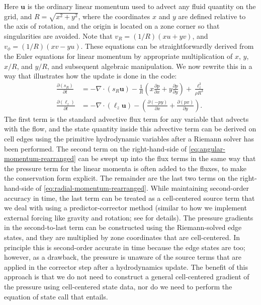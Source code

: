 \documentclass[12pt]{article}
\begin{document}
Here $\mathbf{u}$ is the ordinary linear momentum used to advect any fluid quantity
on the grid, and $R = \sqrt{x^2 + y^2}$, where the coordinates $x$ and $y$ are defined
relative to the axis of rotation, and the origin is located on a zone corner
so that singularities are avoided. Note that $v_R = (1 / R)(x u + y v)$, and
$v_\phi = (1/R)(x v - y u)$. These equations can be straightforwardly derived from
the Euler equations for linear momentum by appropriate multiplication of $x$, $y$,
$x / R$, and $y/R$, and subsequent algebraic manipulation. We now rewrite this in a way
that illustrates how the update is done in the code:
\begin{align}
  \frac{\partial(s_R)}{\partial t} &= -\nabla \cdot (s_R \mathbf{u})
    - \frac{1}{R}\left(x \frac{\partial p}{\partial x} + y \frac{\partial p}{\partial y}\right)
    + \frac{\ell_z^2}{\rho R^3} \label{eq:radial-momentum-rearranged}\\
    \frac{\partial(\ell_z)}{\partial t} &= -\nabla \cdot (\ell_z \mathbf{u}) - \left(\frac{\partial (-py)}{\partial x} + \frac{\partial(px)}{\partial y}\right).\label{eq:angular-momentum-rearranged}
\end{align}
The first term is the standard advective flux term for any variable that advects with
the flow, and the state quantity inside this advective term can be derived on cell edges
using the primitive hydrodynamic variables after a Riemann solver has been performed.
The second term on the right-hand-side of \autoref{eq:angular-momentum-rearranged} can be swept up
into the flux terms in the same way that the pressure term for the linear momenta
is often added to the fluxes, to make the conservation form explicit. The remainder
are the last two terms on the right-hand-side of \autoref{eq:radial-momentum-rearranged}.
While maintaining second-order accuracy in time, the last term can be treated as a
cell-centered source term that we deal with using a predictor-corrector
method (similar to how we implement external forcing like gravity and rotation; see
\cite{castro} for details). The pressure gradients in the second-to-last term can be
constructed using the Riemann-solved edge states, and they are multiplied by zone
coordinates that are cell-centered. In principle this is second-order accurate in time
because the edge states are too; however, as a drawback, the pressure is unaware of the
source terms that are applied in the corrector step after a hydrodynamics update. The
benefit of this approach is that we do not need to construct a general cell-centered
gradient of the pressure using cell-centered state data, nor do we need to perform the
equation of state call that entails.
\end{document}
